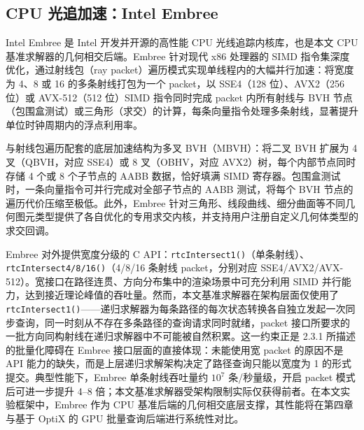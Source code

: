\subsection{CPU 光追加速：Intel Embree}

Intel Embree 是 Intel 开发并开源的高性能 CPU 光线追踪内核库，也是本文 CPU 基准求解器的几何相交后端。Embree 针对现代 x86 处理器的 SIMD 指令集深度优化，通过射线包（ray packet）遍历模式实现单线程内的大幅并行加速：将宽度为 4、8 或 16 的多条射线打包为一个 packet，以 SSE4（128 位）、AVX2（256 位）或 AVX-512（512 位）SIMD 指令同时完成 packet 内所有射线与 BVH 节点（包围盒测试）或三角形（求交）的计算，每条向量指令处理多条射线，显著提升单位时钟周期内的浮点利用率。

与射线包遍历配套的底层加速结构为多叉 BVH（MBVH）：将二叉 BVH 扩展为 4 叉（QBVH，对应 SSE4）或 8 叉（OBHV，对应 AVX2）树，每个内部节点同时存储 4 个或 8 个子节点的 AABB 数据，恰好填满 SIMD 寄存器。包围盒测试时，一条向量指令可并行完成对全部子节点的 AABB 测试，将每个 BVH 节点的遍历代价压缩至极低。此外，Embree 针对三角形、线段曲线、细分曲面等不同几何图元类型提供了各自优化的专用求交内核，并支持用户注册自定义几何体类型的求交回调。

Embree 对外提供宽度分级的 C API：\texttt{rtcIntersect1()}（单条射线）、\texttt{rtcIntersect4/8/16()}（4/8/16 条射线 packet，分别对应 SSE4/AVX2/AVX-512）。宽接口在路径连贯、方向分布集中的渲染场景中可充分利用 SIMD 并行能力，达到接近理论峰值的吞吐量。然而，本文基准求解器在架构层面仅使用了 \texttt{rtcIntersect1()}——递归求解器为每条路径的每次状态转换各自独立发起一次同步查询，同一时刻从不存在多条路径的查询请求同时就绪，packet 接口所要求的一批方向同构射线在递归求解器中不可能被自然积累。这一约束正是 2.3.1 所描述的批量化障碍在 Embree 接口层面的直接体现：未能使用宽 packet 的原因不是 API 能力的缺失，而是上层递归求解架构决定了路径查询只能以宽度为 1 的形式提交。典型性能下，Embree 单条射线吞吐量约 $10^7$ 条/秒量级，开启 packet 模式后可进一步提升 4--8 倍；本文基准求解器受架构限制实际仅获得前者。在本文实验框架中，Embree 作为 CPU 基准后端的几何相交底层支撑，其性能将在第四章与基于 OptiX 的 GPU 批量查询后端进行系统性对比。


